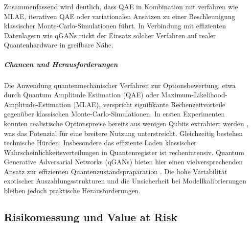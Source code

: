 Zusammenfassend wird deutlich, dass QAE in Kombination mit verfahren wie MLAE, iterativen QAE oder variationalen Ansätzen zu einer Beschleunigung klassischer Monte-Carlo-Simulationen führt. In Verbindung mit effizienten Datenlagern wie qGANs rückt der Einsatz solcher Verfahren auf realer Quantenhardware in greifbare Nähe.

\subparagraph{Chancen und Herausforderungen}

Die Anwendung quantenmechanischer Verfahren zur Optionsbewertung, etwa durch Quantum Amplitude Estimation (QAE) oder Maximum-Likelihood-Amplitude-Estimation (MLAE), verspricht signifikante Rechenzeitvorteile gegenüber klassischen Monte-Carlo-Simulationen. In ersten Experimenten konnten realistische Optionspreise bereits aus wenigen Qubits extrahiert werden \cite[S. 4–6]{stamatopoulos_option_2020}, was das Potenzial für eine breitere Nutzung unterstreicht. Gleichzeitig bestehen technische Hürden: Insbesondere das effiziente Laden klassischer Wahrscheinlichkeitsverteilungen in Quantenregister ist rechenintensiv. Quantum Generative Adversarial Networks (qGANs) bieten hier einen vielversprechenden Ansatz zur effizienten Quantenzustandspräparation \cite[S. 1–3]{zoufal_quantum_2019}. Die hohe Variabilität exotischer Auszahlungsstrukturen und die Unsicherheit bei Modellkalibrierungen bleiben jedoch praktische Herausforderungen.

\subsection{Risikomessung und Value at Risk}

